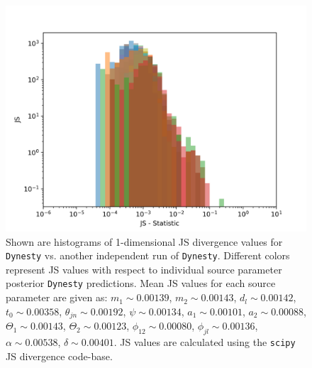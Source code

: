 \begin{figure}
    \includegraphics[width=\columnwidth]{figures/dynesty-dynesty_indiJS.png}
    \caption[Dynesty vs. Dynesty full 1-D JS divergence histogram plot.]{\label{fig:dyn_vs_dyn_indi_JS} Shown are histograms of 1-dimensional JS divergence values for \texttt{Dynesty} vs. another independent run of \texttt{Dynesty}. Different colors represent JS values with respect to individual source parameter posterior \texttt{Dynesty} predictions. Mean JS values for each source parameter are given as: $m_1 \sim 0.00139$, $m_2 \sim 0.00143$, $d_l \sim 0.00142$, $t_0 \sim 0.00358$, $\theta_{jn} \sim 0.00192$, $\psi \sim 0.00134$, $a_1 \sim 0.00101$, $a_2 \sim 0.00088$, $\Theta_1 \sim 0.00143$, $\Theta_2 \sim 0.00123$, $\phi_{12} \sim 0.00080$, $\phi_{jl} \sim 0.00136$, $\alpha \sim 0.00538$, $\delta \sim 0.00401$. JS values are calculated using the \texttt{scipy} JS divergence code-base.~}
\end{figure}

